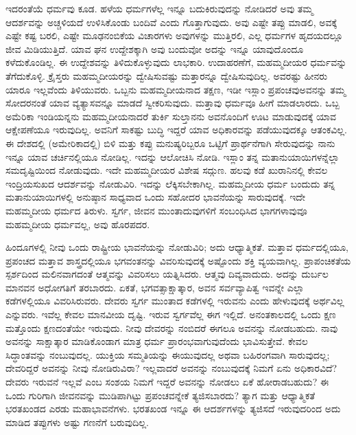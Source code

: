 
ಇದರಂತೆಯೆ ಧರ್ಮವು ಕೂಡ. ಹಳೆಯ ಧರ್ಮಗಳೆಲ್ಲ ಇನ್ನೂ ಬದುಕಿರುವುದನ್ನು ನೋಡಿದರೆ ಅವು ತಮ್ಮ ಆದರ್ಶವನ್ನು ಅಚ್ಚಳಿಯದೆ ಉಳಿಸಿಕೊಂಡು ಬಂದಿವೆ ಎಂದು ಗೊತ್ತಾಗುವುದು. ಅವು ಎಷ್ಟೇ ತಪ್ಪು ಮಾಡಲಿ, ಅವಕ್ಕೆ ಎಷ್ಟೇ ಕಷ್ಟ ಬರಲಿ, ಎಷ್ಟೇ ಮೂಢನಂಬಿಕೆಯ ವಿಚಾರಗಳು ಅವುಗಳನ್ನು ಮುತ್ತಿರಲಿ, ಎಲ್ಲ ಧರ್ಮಗಳ ಹೃದಯದಲ್ಲೂ ಜೀವ ಮಿಡಿಯುತ್ತಿದೆ. ಯಾವ ಘನ ಉದ್ದೇಶಕ್ಕಾಗಿ ಅವು ಬಂದುವೋ ಅದನ್ನು ಇನ್ನೂ ಯಾವುದೊಂದೂ ಕಳೆದುಕೊಂಡಿಲ್ಲ. ಈ ಉದ್ದೇಶವನ್ನು ತಿಳಿದುಕೊಳ್ಳುವುದು ಲಾಭಕಾರಿ. ಉದಾಹರಣೆಗೆ, ಮಹಮ್ಮದೀಯರ ಧರ್ಮವನ್ನು ತೆಗೆದುಕೊಳ್ಳಿ. ಕ್ರೈಸ್ತರು ಮಹಮ್ಮದೀಯರನ್ನು ದ್ವೇಷಿಸುವಷ್ಟು ಮತ್ತಾರನ್ನೂ ದ್ವೇಷಿಸುವುದಿಲ್ಲ. ಅವರಷ್ಟು ಹೀನರು ಯಾರೂ ಇಲ್ಲವೆಂದು ತಿಳಿಯುವರು. ಒಬ್ಬನು ಮಹಮ್ಮದೀಯನಾದ ತಕ್ಷಣ, ಇಡೀ ಇಸ್ಲಾಂ ಪ್ರಪಂಚವು\break ಅವನನ್ನು ತಮ್ಮ ಸೋದರನಂತೆ ಯಾವ ವ್ಯತ್ಯಾಸವನ್ನೂ ಮಾಡದೆ ಸ್ವೀಕರಿಸುವುದು. ಮತ್ತಾವು ಧರ್ಮವೂ ಹೀಗೆ ಮಾಡಲಾರದು. ಒಬ್ಬ ಅಮೆರಿಕಾ ಇಂಡಿಯನ್ನನು ಮಹ\break ಮ್ಮದೀಯನಾದರೆ ತುರ್ಕಿ ಸುಲ್ತಾನನು ಅವನೊಂದಿಗೆ ಊಟ ಮಾಡುವುದಕ್ಕೆ ಯಾವ ಆಕ್ಷೇಪಣೆಯೂ ಇರುವುದಿಲ್ಲ. ಅವನಿಗೆ ಸಾಕಷ್ಟು ಬುದ್ಧಿ ಇದ್ದರೆ ಯಾವ ಅಧಿಕಾರವನ್ನು ಪಡೆಯುವುದಕ್ಕೂ ಆತಂಕವಿಲ್ಲ. ಈ ದೇಶದಲ್ಲಿ (ಅಮೇರಿಕಾದಲ್ಲಿ) ಬಿಳಿ ಮತ್ತು ಕಪ್ಪು ಮನುಷ್ಯರಿಬ್ಬರೂ ಒಟ್ಟಿಗೆ ಪ್ರಾರ್ಥನೆಗಾಗಿ ಸೇರುವುದನ್ನು ನಾನು ಇನ್ನೂ ಯಾವ ಚರ್ಚಿನಲ್ಲಿಯೂ ನೋಡಿಲ್ಲ. ಇದನ್ನು ಆಲೋಚಿಸಿ ನೋಡಿ. ಇಸ್ಲಾಂ ತನ್ನ ಮತಾನುಯಾಯಿಗಳನ್ನೆಲ್ಲಾ ಸಮದೃಷ್ಟಿಯಿಂದ ನೋಡುವುದು. ಇದೇ ಮಹಮ್ಮದೀಯರ ವಿಶೇಷ ಸದ್ಗುಣ. ಹಲವು ಕಡೆ ಖುರಾನಿನಲ್ಲಿ ಕೇವಲ ಇಂದ್ರಿಯಸುಖದ ಆದರ್ಶವನ್ನು ನೋಡುವಿರಿ. ಇದನ್ನು ಲೆಕ್ಕಿಸಬೇಕಾಗಿಲ್ಲ. ಮಹಮ್ಮದೀಯ ಧರ್ಮ ಬಂದುದು ತನ್ನ ಮತಾನುಯಾಯಿಗಳಲ್ಲಿ ಅನುಷ್ಠಾನ ಸಾಧ್ಯವಾದ ಒಂದು ಸಹೋದರ ಭಾವನೆಯನ್ನು ಸಾರುವುದಕ್ಕೆ. ಇದೇ ಮಹಮ್ಮದೀಯ ಧರ್ಮದ ತಿರುಳು. ಸ್ವರ್ಗ, ಜೀವನ ಮುಂತಾದುವುಗಳಿಗೆ ಸಂಬಂಧಿಸಿದ ಭಾಗಗಳಾವುವೂ ಮಹಮ್ಮದೀಯ ಧರ್ಮವಲ್ಲ, ಅವು ಹೊರಪದರ.

ಹಿಂದೂಗಳಲ್ಲಿ ನೀವು ಒಂದು ರಾಷ್ಟ್ರೀಯ ಭಾವನೆಯನ್ನು ನೋಡುವಿರಿ; ಅದು ಆಧ್ಯಾತ್ಮಿಕತೆ. ಮತ್ತಾವ ಧರ್ಮದಲ್ಲಿಯೂ, ಪ್ರಪಂಚದ ಮತ್ತಾವ ಶಾಸ್ತ್ರದಲ್ಲಿಯೂ ಭಗವಂತನನ್ನು ವಿವರಿಸುವುದಕ್ಕೆ ಅಷ್ಟೊಂದು ಶಕ್ತಿ ವ್ಯಯವಾಗಿಲ್ಲ. ಪ್ರಾಪಂಚಿಕತೆಯ ಸ್ಪರ್ಶದಿಂದ ಮಲಿನವಾಗದಂತೆ ಆತ್ಮವನ್ನು ವಿವರಿಸಲು ಯತ್ನಿಸಿದರು. ಆತ್ಮವು ದಿವ್ಯವಾದುದು. ಅದನ್ನು ದುರ್ಬಲ ಮಾನವನ ಅಧೋಗತಿಗೆ ತರಬಾರದು. ಏಕತೆ, ಭಗವತ್ಸಾಕ್ಷಾತ್ಕಾರ, ಅವನ ಸರ್ವವ್ಯಾಪಿತ್ವ ಇವನ್ನೇ ಎಲ್ಲಾ ಕಡೆಗಳಲ್ಲಿಯೂ ವಿವರಿಸಿರುವರು. ದೇವರು ಸ್ವರ್ಗ ಮುಂತಾದ ಕಡೆಗಳಲ್ಲಿ ಇರುವನು ಎಂದು ಹೇಳುವುದಕ್ಕೆ ಅರ್ಥವಿಲ್ಲ ಎನ್ನುವರು. ಇವೆಲ್ಲ ಕೇವಲ ಮಾನವೀಯ ದೃಷ್ಟಿ. ಇರುವ ಸ್ವರ್ಗವೆಲ್ಲ ಈಗ ಇಲ್ಲಿದೆ. ಅನಂತಕಾಲದಲ್ಲಿ ಒಂದು ಕ್ಷಣ ಮತ್ತೊಂದು ಕ್ಷಣದಂತೆಯೇ ಇರುವುದು. ನೀವು ದೇವರನ್ನು ನಂಬಿದರೆ ಈಗಲೂ ಅವನನ್ನು ನೋಡಬಹುದು. ನಾವು ಅವನನ್ನು ಸಾಕ್ಷಾತ್ಕಾರ ಮಾಡಿಕೊಂಡಾಗ ಮಾತ್ರ ಧರ್ಮ ಪ್ರಾರಂಭವಾಗುವುದೆಂದು ಭಾವಿಸುತ್ತೇವೆ. ಕೇವಲ ಸಿದ್ಧಾಂತವನ್ನು ನಂಬುವುದಲ್ಲ. ಯುಕ್ತಿಯ ಸಮ್ಮತಿಯನ್ನು ಈಯುವುದಲ್ಲ ಅಥವಾ ಬಹಿರಂಗವಾಗಿ ಸಾರುವುದಲ್ಲ; ದೇವರಿದ್ದರೆ ಅವನನ್ನು ನೀವು ನೋಡಿರುವಿರಾ? ಇಲ್ಲವಾದರೆ ಅವನನ್ನು ನಂಬುವುದಕ್ಕೆ ನಿಮಗೆ ಏನು ಅಧಿಕಾರವಿದೆ? ದೇವರು ಇರುವನೆ ಇಲ್ಲವೆ ಎಂಬ ಸಂಶಯ ನಿಮಗೆ ಇದ್ದರೆ ಅವನನ್ನು ನೋಡಲು ಏಕೆ ಹೋರಾಡಬಹುದು? ಈ ಒಂದು ಗುರಿಗಾಗಿ ಜೀವನವನ್ನು ಮುಡಿಪಾಗಿಟ್ಟು ಪ್ರಪಂಚವನ್ನೇಕೆ ತ್ಯಜಿಸಬಾರದು? ತ್ಯಾಗ ಮತ್ತು ಆಧ್ಯಾತ್ಮಿಕತೆ ಭರತಖಂಡದ ಎರಡು ಮಹಾಭಾವನೆಗಳು. ಭರತಖಂಡ ಇನ್ನೂ ಈ ಆದರ್ಶಗಳನ್ನು ತ್ಯಜಿಸದೆ ಇರುವುದರಿಂದ ಅದು ಮಾಡಿದ ತಪ್ಪುಗಳು ಅಷ್ಟು ಗಣನೆಗೆ ಬರುವುದಿಲ್ಲ.


